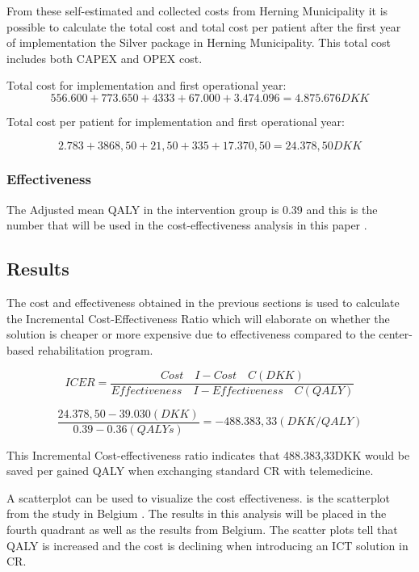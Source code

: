 From these self-estimated and collected costs from Herning Municipality it is possible to calculate the total cost and total cost per patient after the first year of implementation the Silver package in Herning Municipality. This total cost includes both CAPEX and OPEX cost.

Total cost for implementation and first operational year:
$$556.600 + 773.650 + 4333 + 67.000 + 3.474.096 = 4.875.676DKK$$

Total cost per patient for implementation and first operational year:

$$2.783+3868,50+21,50+335+17.370,50= 24.378,50DKK$$

\subsubsection{Effectiveness}

The Adjusted mean QALY in the intervention group is 0.39 and this is the number that will be used in the cost-effectiveness analysis in this paper \cite{costeffect}. 

\subsection{Results}

The cost and effectiveness obtained in the previous sections is used to calculate the Incremental Cost-Effectiveness Ratio which will elaborate on whether the solution is cheaper or more expensive due to effectiveness compared to the center-based rehabilitation program.  

$$ICER = \frac{Cost \quad I - Cost \quad C(DKK)}{Effectiveness \quad I - Effectiveness \quad C(QALY)}$$ 

$$\frac{24.378,50-39.030(DKK)}{0.39-0.36(QALYs)}=-488.383,33(DKK/QALY)$$ 

This Incremental Cost-effectiveness ratio indicates that 488.383,33DKK would be saved per gained QALY when exchanging standard CR with telemedicine. 

A scatterplot can be used to visualize the cost effectiveness.  is the scatterplot from the study in Belgium \cite{costeffect}. The results in this analysis will be placed in the fourth quadrant as well as the results from Belgium. The scatter plots tell that QALY is increased and the cost is declining when introducing an ICT solution in CR.  


